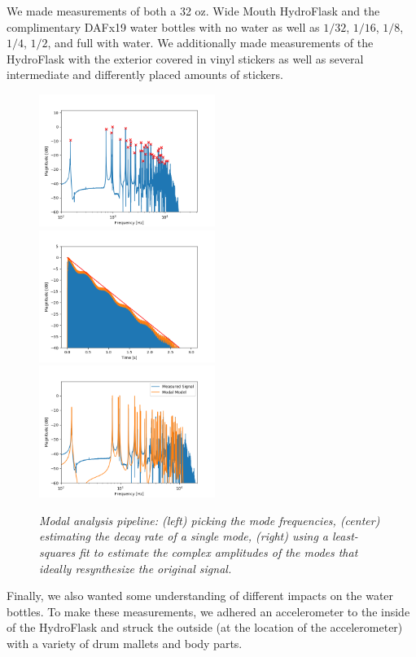 \documentclass[twoside,a4paper]{article}
\begin{document}
We made measurements of both a 32 oz. Wide Mouth HydroFlask and the complimentary DAFx19 water bottles with no water as well as $1/32$, $1/16$, $1/8$, $1/4$, $1/2$, and full with water. We additionally made measurements of the HydroFlask with the exterior covered in vinyl stickers as well as several intermediate and differently placed amounts of stickers. 


\begin{figure}
    \centering
    \includegraphics[width=2.25in,trim={0 0 1cm 1cm},clip]{../Figures/ModePick_ex}
    \includegraphics[width=2.25in,trim={0 0 1cm 1cm},clip]{../Figures/DecayFit_ex}
    \includegraphics[width=2.25in,trim={0 0 1cm 1cm},clip]{../Figures/Model_ex}
    \caption{\it{Modal analysis pipeline: (left) picking the mode frequencies,
    (center) estimating the decay rate of a single mode,
    (right) using a least-squares fit to estimate the complex
    amplitudes of the modes that ideally resynthesize the
    original signal.}}
    \label{fig:modal_analysis}
\end{figure}

Finally, we also wanted some understanding of different impacts on the water bottles. To make these measurements, we adhered an accelerometer to the inside of the HydroFlask and struck the outside (at the location of the accelerometer) with a variety of drum mallets and body parts.  
\end{document}
